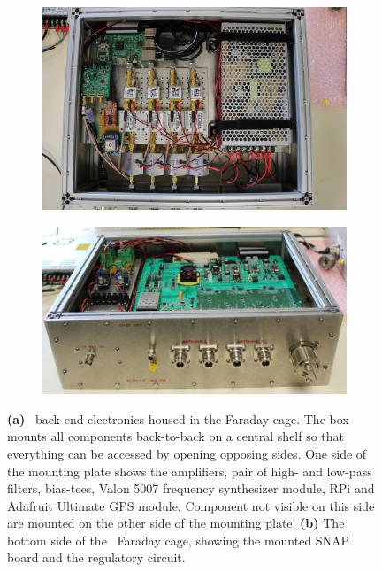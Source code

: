 \begin{figure}
	\centering
	\begin{subfigure}[t]{0.52\textwidth}
		\centering
		\includegraphics[width=\linewidth]{Figures/47093126504_fa0061a85b_o} 
		\caption{} \label{Fig:47093126504_fa0061a85b_o}
	\end{subfigure}
	\hfill
	\begin{subfigure}[t]{0.47\textwidth}
		\centering
		\includegraphics[width=\linewidth]{Figures/47093128324_04792aa5c5_o}
		\caption{} \label{Fig:47093128324_04792aa5c5_o}
	\end{subfigure}
	\caption{{\bf (a)} \albatros\ back-end electronics housed in the Faraday cage. The box mounts all components back-to-back on a central shelf so that everything can be accessed by opening opposing sides. One side of the mounting plate shows the amplifiers, pair of high- and low-pass filters, bias-tees, Valon 5007 frequency synthesizer module, RPi and Adafruit Ultimate GPS module. Component not visible on this side are mounted on the other side of the mounting plate. {\bf (b)} The bottom side of the \albatros\ Faraday cage, showing the mounted SNAP board and the regulatory circuit.} \label{Fig:faraday1}
\end{figure}

